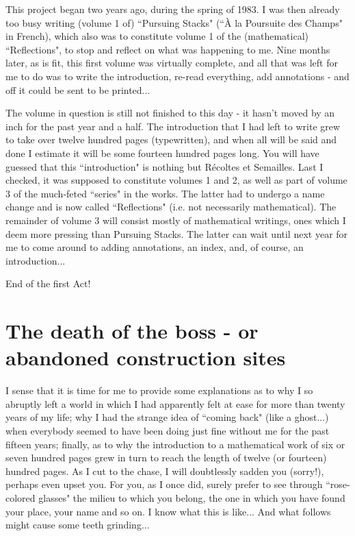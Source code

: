 This project began two years ago, during the spring of 1983. I was then already too busy writing (volume 1 of) ``Pursuing Stacks" (``\`A la Poursuite des Champs" in French), which also was to constitute volume 1 of the (mathematical) ``Reflections", to stop and reflect on what was happening to me. Nine months later, as is fit, this first volume was virtually complete, and all that was left for me to do was to write the introduction, re-read everything, add annotations - and off it could be sent to be printed... 

The volume in question is still not finished to this day - it hasn't moved by an inch for the past year and a half. The introduction that I had left to write grew to take over twelve hundred pages (typewritten), and when all will be said and done I estimate it will be some fourteen hundred pages long. You will have guessed that this ``introduction" is nothing but R\'ecoltes et Semailles. Last I checked, it was supposed to constitute volumes 1 and 2, as well as part of volume 3 of the much-feted ``series" in the works. The latter had to undergo a name change and is now called ``Reflections" (i.e. not necessarily mathematical). The remainder of volume 3 will consist mostly of mathematical writings, ones which I deem more pressing than Pursuing Stacks. The latter can wait until next year for me to come around to adding annotations, an index, and, of course, an introduction...

End of the first Act!

\section{The death of the boss - or abandoned construction sites}

I sense that it is time for me to provide some explanations as to why I so abruptly left a world in which I had apparently felt at ease for more than twenty years of my life; why I had the strange idea of ``coming back" (like a ghost...) when everybody seemed to have been doing just fine without me for the past fifteen years; finally, as to why the introduction to a mathematical work of six or seven hundred pages grew in turn to reach the length of twelve (or fourteen) hundred pages. As I cut to the chase, I will doubtlessly sadden you (sorry!), perhaps even upset you. For you, as I once did, surely prefer to see through ``rose-colored glasses" the milieu to which you belong, the one in which you have found your place, your name and so on. I know what this is like... And what follows might cause some teeth grinding...

